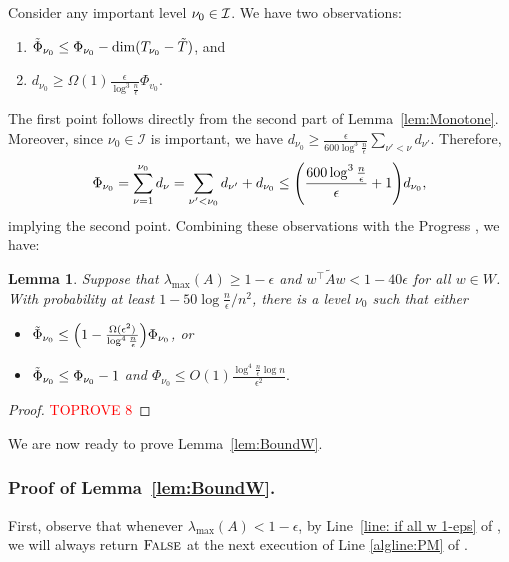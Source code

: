 \documentclass[11pt]{article}
\newtheorem{lemma}[theorem]{Lemma}
\let\originalleft\left
\let\originalright\right
\renewcommand{\left}{\mathopen{}\mathclose\bgroup\originalleft}
\renewcommand{\right}{\aftergroup\egroup\originalright}
\def\dim#1{\mathrm{dim} (#1)}
\newcommand\ww{\boldsymbol{\mathit{w}}}
\renewcommand\AA{\boldsymbol{\mathit{A}}}
\newcommand\WW{\boldsymbol{\mathit{W}}}
\newcommand\AAtil{\boldsymbol{\widetilde{\mathit{A}}}}
\begin{document}
Consider any important level $\nu_{0} \in \cal{I}$. We have two observations:
\begin{enumerate}
	\item \label{enu:phi 1} $\Phitil_{\nu_{0}}\leq\Phi_{\nu_{0}}-\dim{T_{\nu_{0}}-\tilde{T}}$, and 
	\item \label{enu:phi 2} $d_{\nu_{0}}\geq\Omega(1)\frac{\epsilon}{\log^{3}\frac{n}{\epsilon}}\Phi_{v_{0}}$. 
\end{enumerate}
The first point follows directly from the second part of Lemma~\ref{lem:Monotone}. Moreover, since $\nu_{0}\in\mathcal{I}$ is important, we have $d_{\nu_{0}}\geq\frac{\epsilon}{600\log^{3}\frac{n}{\epsilon}}\sum_{\nu'<\nu}d_{\nu'}.$ Therefore, 
\[
\Phi_{\nu_{0}}=\sum_{\nu=1}^{\nu_{0}}d_{\nu}=\sum_{\nu'<\nu_{0}}d_{\nu'}+d_{\nu_{0}}\leq\left(\frac{600\log^{3}\frac{n}{\epsilon}}{\epsilon}+1\right)d_{\nu_{0}},
\]
implying the second point. 
Combining these observations with the Progress , we have:
\begin{lemma}
	\label{claim:potential decrease}Suppose that $\lambda_{\max}(\AA)\ge1-\epsilon$ and $\ww^{\top}\AAtil\ww<1-40\epsilon$ for all $\ww\in\WW$. With probability at least $1-50\log\frac{n}{\epsilon}/n^{2}$, there is a level $\nu_{0}$ such that either 
	\begin{itemize}
		\item $\Phitil_{\nu_{0}}\le\left(1-\frac{\Omega(\epsilon^{2})}{\log^{4}\frac{n}{\epsilon}}\right)\Phi_{\nu_{0}}$, or 
		\item $\tilde{\Phi}_{\nu_{0}}\le\Phi_{\nu_{0}}-1$ and $\Phi_{\nu_{0}}\leq O(1)\frac{\log^{4}\frac{n}{\epsilon}\log n}{\epsilon^{2}}.$
	\end{itemize}
\end{lemma}

\begin{proof}\textcolor{red}{TOPROVE 8}\end{proof}
We are now ready to prove Lemma~\ref{lem:BoundW}. 

\subsubsection*{Proof of Lemma~\ref{lem:BoundW}.}

First, observe that whenever $\lambda_{\max}(\AA)<1-\epsilon$, by Line~\ref{line: if all w 1-eps} of , we will always return $\textsc{False}$ at the next execution of Line \ref{algline:PM} of .
\end{document}
